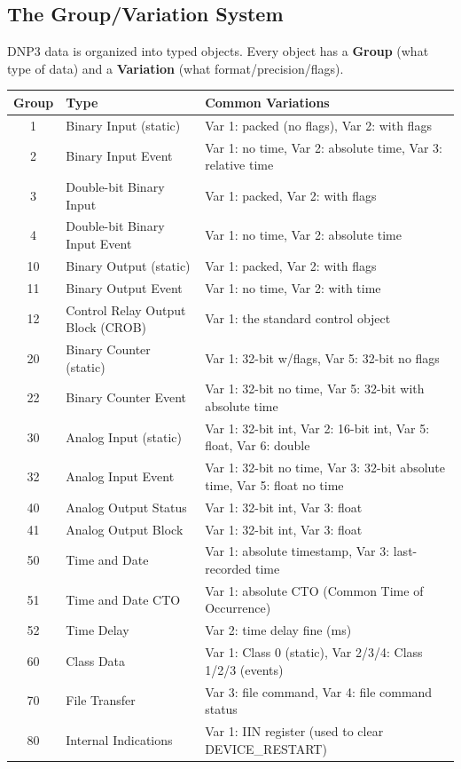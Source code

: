 \documentclass[11pt,twoside]{article}
\begin{document}
\subsection{The Group/Variation System}

DNP3 data is organized into typed objects. Every object has a \textbf{Group} (what type of data) and a \textbf{Variation} (what format/precision/flags).

\begin{longtable}{cll}
\toprule
\textbf{Group} & \textbf{Type} & \textbf{Common Variations} \\
\midrule
\endhead
1 & Binary Input (static) & Var 1: packed (no flags), Var 2: with flags \\
2 & Binary Input Event & Var 1: no time, Var 2: absolute time, Var 3: relative time \\
3 & Double-bit Binary Input & Var 1: packed, Var 2: with flags \\
4 & Double-bit Binary Input Event & Var 1: no time, Var 2: absolute time \\
10 & Binary Output (static) & Var 1: packed, Var 2: with flags \\
11 & Binary Output Event & Var 1: no time, Var 2: with time \\
12 & Control Relay Output Block (CROB) & Var 1: the standard control object \\
20 & Binary Counter (static) & Var 1: 32-bit w/flags, Var 5: 32-bit no flags \\
22 & Binary Counter Event & Var 1: 32-bit no time, Var 5: 32-bit with absolute time \\
30 & Analog Input (static) & Var 1: 32-bit int, Var 2: 16-bit int, Var 5: float, Var 6: double \\
32 & Analog Input Event & Var 1: 32-bit no time, Var 3: 32-bit absolute time, Var 5: float no time \\
40 & Analog Output Status & Var 1: 32-bit int, Var 3: float \\
41 & Analog Output Block & Var 1: 32-bit int, Var 3: float \\
50 & Time and Date & Var 1: absolute timestamp, Var 3: last-recorded time \\
51 & Time and Date CTO & Var 1: absolute CTO (Common Time of Occurrence) \\
52 & Time Delay & Var 2: time delay fine (ms) \\
60 & Class Data & Var 1: Class 0 (static), Var 2/3/4: Class 1/2/3 (events) \\
70 & File Transfer & Var 3: file command, Var 4: file command status \\
80 & Internal Indications & Var 1: IIN register (used to clear DEVICE\_RESTART) \\
\bottomrule
\end{longtable}
\end{document}
